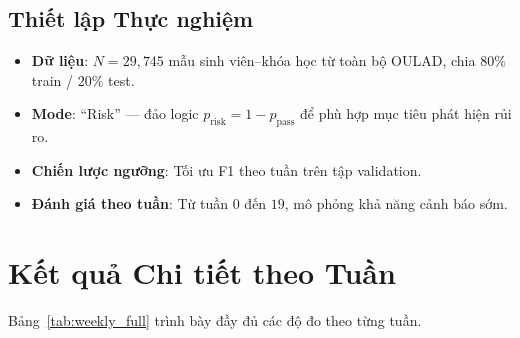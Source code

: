 \documentclass[12pt,a4paper]{article}
\begin{document}
\subsection{Thiết lập Thực nghiệm}

\begin{itemize}
    \item \textbf{Dữ liệu}: $N = 29,745$ mẫu sinh viên--khóa học từ toàn bộ OULAD, chia $80\%$ train / $20\%$ test.
    \item \textbf{Mode}: ``Risk'' --- đảo logic $p_{\text{risk}} = 1 - p_{\text{pass}}$ để phù hợp mục tiêu phát hiện rủi ro.
    \item \textbf{Chiến lược ngưỡng}: Tối ưu F1 theo tuần trên tập validation.
    \item \textbf{Đánh giá theo tuần}: Từ tuần $0$ đến $19$, mô phỏng khả năng cảnh báo sớm.
\end{itemize}

\section{Kết quả Chi tiết theo Tuần}

Bảng~\ref{tab:weekly_full} trình bày đầy đủ các độ đo theo từng tuần.
\end{document}
